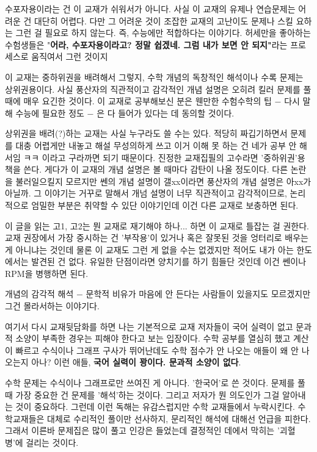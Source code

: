 수포자용이라는 건 이 교재가 쉬워서가 아니다. 사실 이 교재의 유제나 연습문제는 어려운 건 대단히 어렵다.
다만 그 어려운 것이 조잡한 교재의 고난이도 문제나 스킬 요하는 그런 걸 필요로 하지 않는다. 즉, 수능에만 적합하다는 이야기다.
허세만을 좋아하는 수험생들은 "\textbf{어라, 수포자용이라고? 정말 쉽겠네. 그럼 내가 보면 안 되지"}라는 프로세스로 움직여서 그런 것이지
\vspace{5mm}

이 교재는 중하위권을 배려해서 그렇지,
수학 개념의 독창적인 해석이나 수록 문제는 상위권용이다.
사실 풍산자의 직관적이고 감각적인 개념 설명은 오히려 킬러 문제를 풀 때에 매우 요긴한 것이다.
이 교재로 공부해보신 분은 웬만한 수험수학의 팁 $-$ 다시 말해 수능에 필요한 정도 $-$ 은 다 들어가 있다는 데 동의할 것이다.
\vspace{5mm}

상위권을 배려(?)하는 교재는 사실 누구라도 쓸 수는 있다. 적당히 짜깁기하면서 문제를 대충 어렵게만 내놓고 해설 무성의하게 쓰고
이거 이해 못 하는 건 네가 공부 안 해서임 ㅋㅋ 이라고 구라까면 되기 때문이다.
진정한 교재집필의 고수라면 '중하위권'용 책을 쓴다.
게다가 이 교재의 개념 설명은 볼 때마다 감탄이 나올 정도이다.
다른 논란을 불러일으킬지 모르지만 쎈의 개념 설명이 갤xx이라면 풍산자의 개념 설명은 아xx가 아닐까.
그 이야기는 거꾸로 말해서 개넘 설명이 너무 직관적이고 감각적이므로, 논리적으로 엄밀한 부분은 취약할 수 있단 이야기인데
이건 다른 교재로 보충하면 된다.
\vspace{5mm}

이 글을 읽는 고1, 고2는 뭔 교재로 재기해야 하나... 하면 이 교재로 틀잡는 걸 권한다.
교재 권장에서 가장 중시하는 건 '부작용'이 있거나 혹은 잘못된 것을 엉터리로 배우는 게 아니냐는 것인데
물론 이 교재도 그런 게 없을 수는 없겠지만 적어도 내가 아는 한도에서는 발견된 건 없다.
유일한 단점이라면 양치기를 하기 힘들단 것인데 이건 쎈이나 RPM을 병행하면 된다.
\vspace{5mm}

개념의 감각적 해석 $-$ 문학적 비유가 마음에 안 든다는 사람들이 있을지도 모르겠지만 그건 몰라서하는 이야기다.
\vspace{5mm}

여기서 다시 교재뒷담화를 하면 나는 기본적으로 교재 저자들이 국어 실력이 없고 문과적 소양이 부족한 경우는 피해야 한다고 보는 입장이다.
수학 공부를 열심히 했고 계산이 빠르고 수식이나 그래프 구사가 뛰어난데도 수학 점수가 안 나오는 애들이 왜 안 나오는지 아나?
이런 애들, \textbf{국어 실력이 꽝이다. 문과적 소양이 없다}.
\vspace{5mm}

수학 문제는 수식이나 그래프로만 쓰여진 게 아니다. '한국어'로 쓴 것이다.
문제를 풀 때 가장 중요한 건 문제를 '해석'하는 것이다. 그리고 저자가 뭔 의도인가 그걸 알아내는 것이 중요하다.
그런데 이런 독해는 유감스럽지만 수학 교재들에서 누락시킨다.
수학교재들은 대체로 수리적인 풀이만 선사하지, 문리적인 해석에 대해선 언급을 피한다.
그래서 이른바 문제집은 많이 풀고 인강은 들었는데 결정적인 데에서 막히는 '괴혈병'에 걸리는 것이다.
\vspace{5mm}


